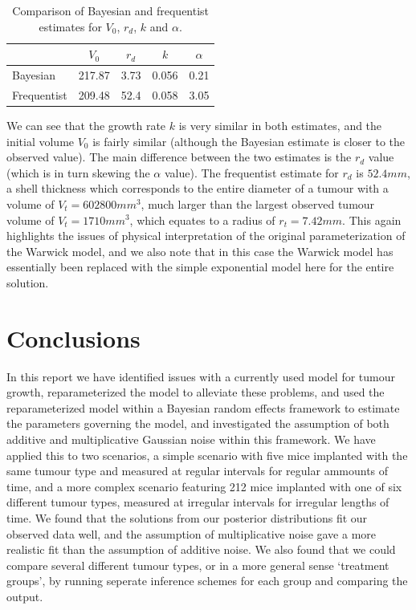 \documentclass[11pt,a4paper]{article}
\begin{document}
\begin{table}
\centering
\begin{tabular}[c]{|l|c|c|c|c|}
\hline
 & $V_0$ & $r_d$ & $k$ &  $\alpha$ \\
\hline
Bayesian & 217.87 & 3.73 & 0.056 & 0.21 \\
Frequentist & 209.48 & 52.4 & 0.058 & 3.05 \\
\hline
\end{tabular} 
\caption{Comparison of Bayesian and frequentist estimates for $V_0$, $r_d$, $k$ and $\alpha$.}
\label{tab:freq_v_bayes}
\end{table}
We can see that the growth rate $k$ is very similar in both estimates, and the initial volume $V_0$ is fairly similar (although the Bayesian estimate is closer to the observed value). The main difference between the two estimates is the $r_d$ value (which is in turn skewing the $\alpha$ value). The frequentist estimate for $r_d$ is $52.4mm$, a shell thickness which corresponds to the entire diameter of a tumour with a volume of $V_t = 602800mm^3$, much larger than the largest observed tumour volume of $V_t=1710mm^3$, which equates to a radius of $r_t=7.42mm$. This again highlights the issues of physical interpretation of the original parameterization of the Warwick model, and we also note that in this case the Warwick model has essentially been replaced with the simple exponential model here for the entire solution.

\section{Conclusions}
\label{sec:conc}

In this report we have identified issues with a currently used model for tumour growth, reparameterized the model to alleviate these problems, and used the reparameterized model within a Bayesian random effects framework to estimate the parameters governing the model, and investigated the assumption of both additive and multiplicative Gaussian noise within this framework. We have applied this to two scenarios, a simple scenario with five mice implanted with the same tumour type and measured at regular intervals for regular ammounts of time, and a more complex scenario featuring 212 mice implanted with one of six different tumour types, measured at irregular intervals for irregular lengths of time. We found that the solutions from our posterior distributions fit our observed data well, and the assumption of multiplicative noise gave a more realistic fit than the assumption of additive noise. We also found that we could compare several different tumour types, or in a more general sense `treatment groups', by running seperate inference schemes for each group and comparing the output.
\end{document}
